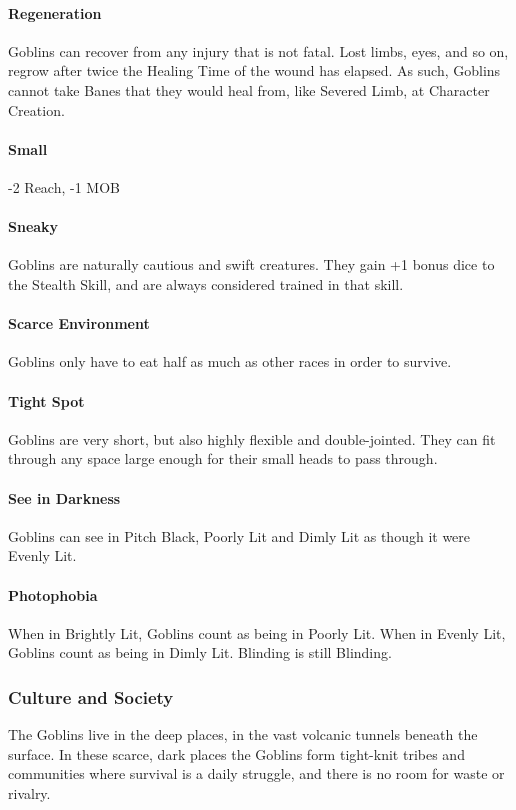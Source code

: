 \documentclass[oneside,11pt,english]{book}
\begin{document}
\paragraph{Regeneration}
Goblins can recover from any injury that is not fatal. Lost limbs, eyes, and so on, regrow after 
twice the Healing Time of the wound has elapsed. As such, Goblins cannot take Banes that they 
would heal from, like Severed Limb, at Character Creation. 
\paragraph{Small}
-2 Reach, -1 MOB 
\paragraph{Sneaky}
Goblins are naturally cautious and swift creatures. They gain +1 bonus dice to the Stealth Skill, 
and are always considered trained in that skill. 
\paragraph{Scarce Environment}
Goblins only have to eat half as much as other races in order to survive. 
\paragraph{Tight Spot}
Goblins are very short, but also highly flexible and double-jointed. They can fit through any 
space large enough for their small heads to pass through. 
\paragraph{See in Darkness}
Goblins can see in Pitch Black, Poorly Lit and Dimly Lit as though it were Evenly Lit. 
\paragraph{Photophobia}
When in Brightly Lit, Goblins count as being in Poorly Lit. When in Evenly Lit, Goblins count as 
being in Dimly Lit. Blinding is still Blinding. 
\subsubsection*{Culture and Society} 
The Goblins live in the deep places, in the vast volcanic tunnels beneath the surface. In these scarce, dark 
places the Goblins form tight-knit tribes and communities where survival is a daily struggle, and there is 
no room for waste or rivalry. 
\end{document}
